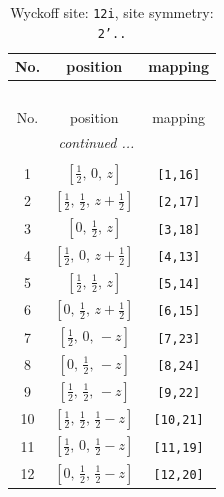\documentclass[fleqn,8pt]{jsarticle}
\begin{document}
\begin{longtable}{ccc}
\caption{Wyckoff site: {\tt 12i}, site symmetry: {\tt 2'..}}
 \\
 \hline \hline
No. & position & mapping \\ \hline \endfirsthead

\multicolumn{2}{l}{\tablename\ \thetable{}} \\
 \hline \hline
No. & position & mapping \\ \hline \endhead

 \hline \hline
\multicolumn{2}{r}{\footnotesize\it continued ...} \\ \endfoot

 \hline \hline
\multicolumn{2}{r}{} \\ \endlastfoot

1 & $\left[ \frac{1}{2},\, 0,\, z \right]$ & {\tt [1,16]} \\ \hline
2 & $\left[ \frac{1}{2},\, \frac{1}{2},\, z + \frac{1}{2} \right]$ & {\tt [2,17]} \\ \hline
3 & $\left[ 0,\, \frac{1}{2},\, z \right]$ & {\tt [3,18]} \\ \hline
4 & $\left[ \frac{1}{2},\, 0,\, z + \frac{1}{2} \right]$ & {\tt [4,13]} \\ \hline
5 & $\left[ \frac{1}{2},\, \frac{1}{2},\, z \right]$ & {\tt [5,14]} \\ \hline
6 & $\left[ 0,\, \frac{1}{2},\, z + \frac{1}{2} \right]$ & {\tt [6,15]} \\ \hline
7 & $\left[ \frac{1}{2},\, 0,\, - z \right]$ & {\tt [7,23]} \\ \hline
8 & $\left[ 0,\, \frac{1}{2},\, - z \right]$ & {\tt [8,24]} \\ \hline
9 & $\left[ \frac{1}{2},\, \frac{1}{2},\, - z \right]$ & {\tt [9,22]} \\ \hline
10 & $\left[ \frac{1}{2},\, \frac{1}{2},\, \frac{1}{2} - z \right]$ & {\tt [10,21]} \\ \hline
11 & $\left[ \frac{1}{2},\, 0,\, \frac{1}{2} - z \right]$ & {\tt [11,19]} \\ \hline
12 & $\left[ 0,\, \frac{1}{2},\, \frac{1}{2} - z \right]$ & {\tt [12,20]} \\
\end{longtable}
\renewcommand{\arraystretch}{1.2}
\end{document}
